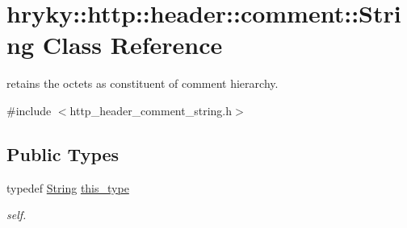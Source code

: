 \hypertarget{classhryky_1_1http_1_1header_1_1comment_1_1_string}{\section{hryky\-:\-:http\-:\-:header\-:\-:comment\-:\-:String Class Reference}
\label{classhryky_1_1http_1_1header_1_1comment_1_1_string}
}


retains the octets as constituent of comment hierarchy.  




{\ttfamily \#include $<$http\-\_\-header\-\_\-comment\-\_\-string.\-h$>$}

\subsection*{Public Types}
\begin{DoxyCompactItemize}
\item 
\hypertarget{classhryky_1_1http_1_1header_1_1comment_1_1_string_ad669eebb23e95ec308a0964fb7863a24}{typedef \hyperlink{classhryky_1_1http_1_1header_1_1comment_1_1_string}{String} \hyperlink{classhryky_1_1http_1_1header_1_1comment_1_1_string_ad669eebb23e95ec308a0964fb7863a24}{this\-\_\-type}}\label{classhryky_1_1http_1_1header_1_1comment_1_1_string_ad669eebb23e95ec308a0964fb7863a24}

\begin{DoxyCompactList}\small\item\em self. \end{DoxyCompactList}\end{DoxyCompactItemize}
